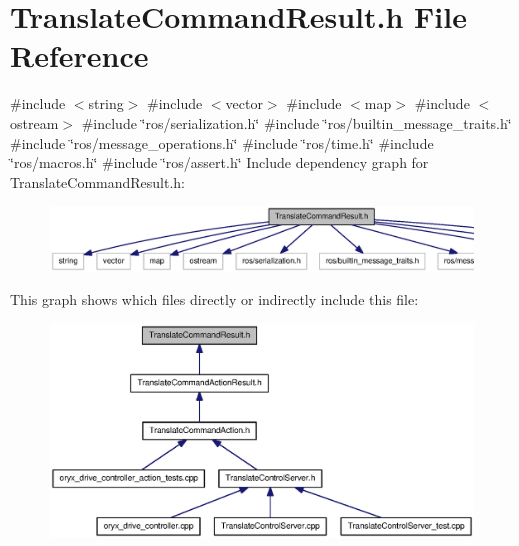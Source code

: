 \section{\-Translate\-Command\-Result.\-h \-File \-Reference}
\label{TranslateCommandResult_8h}
{\ttfamily \#include $<$string$>$}\*
{\ttfamily \#include $<$vector$>$}\*
{\ttfamily \#include $<$map$>$}\*
{\ttfamily \#include $<$ostream$>$}\*
{\ttfamily \#include \char`\"{}ros/serialization.\-h\char`\"{}}\*
{\ttfamily \#include \char`\"{}ros/builtin\-\_\-message\-\_\-traits.\-h\char`\"{}}\*
{\ttfamily \#include \char`\"{}ros/message\-\_\-operations.\-h\char`\"{}}\*
{\ttfamily \#include \char`\"{}ros/time.\-h\char`\"{}}\*
{\ttfamily \#include \char`\"{}ros/macros.\-h\char`\"{}}\*
{\ttfamily \#include \char`\"{}ros/assert.\-h\char`\"{}}\*
\-Include dependency graph for \-Translate\-Command\-Result.\-h\-:
\nopagebreak
\begin{figure}[H]
\begin{center}
\leavevmode
\includegraphics[width=350pt]{TranslateCommandResult_8h__incl}
\end{center}
\end{figure}
\-This graph shows which files directly or indirectly include this file\-:
\nopagebreak
\begin{figure}[H]
\begin{center}
\leavevmode
\includegraphics[width=350pt]{TranslateCommandResult_8h__dep__incl}
\end{center}
\end{figure}
